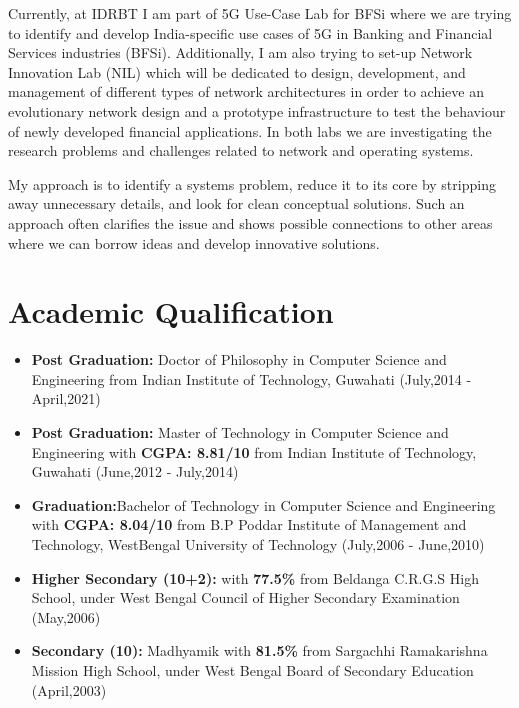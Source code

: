 \documentclass{article}
\begin{document}
Currently, at IDRBT I am part of 5G Use-Case Lab for BFSi where we are trying to identify and develop India-specific use cases of 5G in Banking and Financial Services industries (BFSi). Additionally, I am also trying to set-up Network Innovation Lab (NIL) which will be dedicated to design, development, and management of different types of network architectures in order to achieve an evolutionary network design and a prototype infrastructure to test the behaviour of newly developed financial applications. In both labs we are investigating the research problems and challenges related to network and operating systems.

My approach is to identify a systems problem, reduce it to its core by stripping away unnecessary details, and look for clean conceptual solutions. Such an approach often clarifies the issue and shows possible connections to other areas where we can borrow ideas and develop innovative solutions.
\section{Academic Qualification} 
	\begin{itemize}
		\item{\bf Post Graduation:} Doctor  of Philosophy in Computer Science and Engineering from Indian Institute of Technology, Guwahati (July,2014 - April,2021)
		\item{\bf Post Graduation:} Master of Technology in Computer Science and Engineering with {\bf CGPA: 8.81/10} from Indian Institute of Technology, Guwahati (June,2012 - July,2014)
		\item{\bf Graduation:}Bachelor of Technology in Computer Science and Engineering with {\bf CGPA: 8.04/10} from B.P Poddar Institute of Management and Technology, WestBengal University of Technology (July,2006 - June,2010)
		\item{\bf Higher Secondary (10+2):} with {\bf 77.5\%} from Beldanga C.R.G.S High School, under West Bengal Council of Higher Secondary Examination (May,2006)
		\item{\bf Secondary (10):} Madhyamik with {\bf 81.5\%} from Sargachhi Ramakarishna Mission High School, under West Bengal Board of Secondary Education (April,2003)
	\end{itemize}
\end{document}
